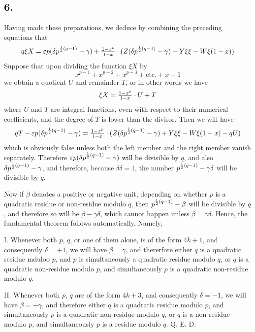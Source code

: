 \documentclass[twoside,12pt]{memoir}
\let\oldfrac\frac
\def\frac#1#2{\mathchoice{\tfrac{#1}{#2}}{\oldfrac{#1}{#2}}{\genfrac{}{}{}{2}{#1}{#2\mathstrut}}{\genfrac{}{}{}{3}{#1}{#2\mathstrut}}}
\begin{document}
\subsection*{6.}

Having made these preparations, we deduce by combining the preceding equations that
\[q \xi {X}=\varepsilon p(\delta p^{\frac{1}{2}(q-1)}-\gamma)+\frac{1-x^{p}}{1-x} \cdot(Z(\delta p^{\frac{1}{2}(q-1)}-\gamma)+Y \xi \xi-W \xi(1-x))\]
Suppose that upon dividing the function \(\xi X\) by
\[x^{p-1}+x^{p-2}+x^{p-3}+\text{etc{.}}+x+1\]
we obtain a quotient \(U\) and remainder \(T\), or in other words we have
\[\xi X=\frac{1-x^{p}}{1-x} \cdot U+T\]
where \(U\) and \(T\) are integral functions, even with respect to their numerical coefficients, and the degree of \(T\) is lower than the divisor. Then we will have
\[q T-\varepsilon p(\delta p^{\frac{1}{2}(q-1)}-\gamma)=\frac{1-x^{p}}{1-x} \cdot(Z(\delta p^{\frac{1}{2}(q-1)}-\gamma)+Y \xi \xi-W \xi(1-x)-q U)\]
which is obviously false unless both the left member and the right member vanish separately. Therefore \(\varepsilon p(\delta p^{\frac{1}{2}(q-1)}-\gamma)\) will be divisible \pagebreak%
by \(q\), and also \(\delta p^{\frac{1}{2}(q-1)}-\gamma\), and therefore, because \(\delta \delta=1\), the number \(p^{\frac{1}{2}(q-1)}-\gamma \delta\) will be divisible by \(q\).

Now if \(\beta\) denotes a positive or negative unit, depending on whether \(p\) is a quadratic residue or non-residue modulo \(q\), then \(p^{\frac{1}{2}(q-1)}-\beta\) will be divisible by \(q\), and therefore so will be \(\beta-\gamma \delta\), which cannot happen unless \(\beta=\gamma \delta\). Hence, the fundamental theorem follows automatically. Namely,

I. Whenever both \(p\), \(q\), or one of them alone, is of the form \(4 k+1\), and consequently \(\delta=+1\), we will have \(\beta=\gamma\), and thererfore either \(q\) is a quadratic residue mduloo \(p\), and \(p\) is simultaneously a quadratic residue modulo \(q\), or \(q\) is a quadratic non-residue modulo \(p\), and simultaneously \(p\) is a quadratic non-residue modulo \(q\).

II. Whenever both \(p\), \(q\) are of the form \(4 k+3\), and consequently \(\delta=-1\), we will have \(\beta=-\gamma\), and therefore either \(q\) is a quadratic residue modulo \(p\), and simultaneously \(p\) is a quadratic non-residue modulo \(q\), or \(q\) is a non-residue modulo \(p\), and simultaneously \(p\) is a residue modulo \(q\). Q. E. D.
\end{document}
